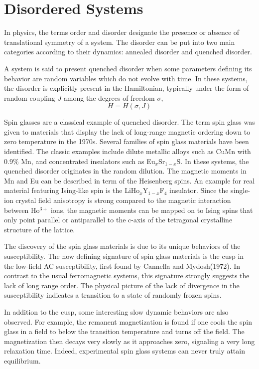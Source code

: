 \section{Disordered Systems}
In physics, the terms order and disorder designate the presence or absence of 
translational symmetry of a system. The disorder can be put into two main categories 
according to their dynamics: annealed disorder and quenched disorder.

A system is said to present quenched disorder when 
some parameters defining its behavior are random variables which do not evolve 
with time. In these systems, the disorder is explicitly present in the Hamiltonian, 
typically under the form of random coupling $J$ among the degrees of freedom $\sigma$,
\begin{equation}
  \label{eq:4}
  H=H(\sigma,J)
\end{equation}

Spin glasses \cite{Binder-Young-1986} are a classical example of quenched disorder. 
The term spin glass was given to materials that display the lack of long-range
magnetic ordering down to zero temperature in the 1970s. 
Several families of spin glass materials have been identified. The classic examples include 
dilute metallic alloys such as CuMn with 0.9\% Mn, and concentrated insulators 
such as Eu$_x$Sr$_{1-x}$S. In these systems, the quenched disorder originates in the random dilution.
The magnetic moments in Mn and Eu can be described in term of the Heisenberg spins.
An example for real material featuring Ising-like spin is the 
LiHo$_x$Y$_{1-x}$F$_4$ insulator. Since the single-ion crystal field anisotropy
is strong compared to the magnetic interaction between Ho$^{3+}$ ions, the magnetic 
moments can be mapped on to Ising spins that only point parallel or antiparallel
to the c-axis of the tetragonal crystalline structure of the lattice. 

The discovery of the spin glass materials is due to its unique behaviors of
the susceptibility. The now defining signature of spin glass materials is 
the cusp in the low-field AC susceptibility, first found by Cannella and Mydosh(1972).
In contrast to the usual ferromagnetic systems, this signature strongly 
suggests the lack of long range order. The physical picture of the lack 
of divergence in the susceptibility indicates a transition to a state of randomly 
frozen spins. 

In addition to the cusp, some interesting slow dynamic 
behaviors are also observed. For example, the remanent magnetization is found 
if one cools the spin glass in a field to below the transition temperature and 
turns off the field. The magnetization then decays very slowly as it approaches 
zero, signaling a very long relaxation time. Indeed, experimental spin glass
systems can never truly attain equilibrium. 

